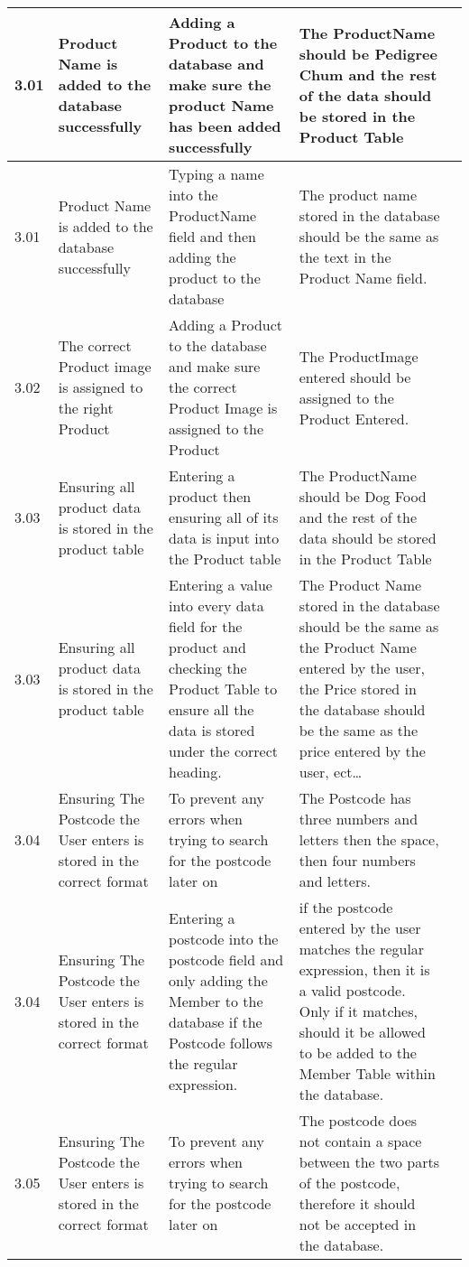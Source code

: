 \begin{flushleft}
\begin{longtable}{|p{1cm}|p{2.5cm}|p{2.5cm}|p{2cm}|p{2cm}|}
	\rowcolor{dark-grey}3.01 & Product Name is added to the database successfully & Adding a Product to the database and make sure the product Name has been added successfully & The ProductName should be Pedigree Chum and the rest of the data should be stored in the Product Table & \\ \hline
	\rowcolor{light-grey}3.01 & Product Name is added to the database successfully & Typing a name into the ProductName field and then adding the product to the database & The product name stored in the database should be the same as the text in the Product Name field.& \\ \hline
	3.02 & The correct Product image is assigned to the right Product & Adding a Product to the database and make sure the correct Product Image is assigned to the Product & The ProductImage entered should be assigned to the Product Entered. & \\ \hline
	\rowcolor{dark-grey}3.03 & Ensuring all product data is stored in the product table & Entering a product then ensuring all of its data is input into the Product table  & The ProductName should be Dog Food and the rest of the data should be stored in the Product Table & \\ \hline
	\rowcolor{light-grey}3.03 & Ensuring all product data is stored in the product table & Entering a value into every data field for the product and checking the Product Table to ensure all the data is stored under the correct heading.  & The Product Name stored in the database should be the same as the Product Name entered by the user, the Price stored in the database should be the same as the price entered by the user, ect\ldots & \\ \hline
	\rowcolor{dark-grey}3.04 & Ensuring The Postcode the User enters is stored in the correct format  & To prevent any errors when trying to search for the postcode later on  & The Postcode has three numbers and letters then the space, then four numbers and letters. & \\ \hline
	\rowcolor{light-grey}3.04 & Ensuring The Postcode the User enters is stored in the correct format  & Entering a postcode into the postcode field and only adding the Member to the database if the Postcode follows the regular expression. &if the postcode entered by the user matches the regular expression, then it is a valid postcode. Only if it matches, should it be allowed to be added to the Member Table within the database.& \\ \hline
	\rowcolor{dark-grey}3.05 & Ensuring The Postcode the User enters is stored in the correct format  & To prevent any errors when trying to search for the postcode later on  & The postcode does not contain a space between the two parts of the postcode, therefore it should not be accepted in the database. & \\ \hline

\end{longtable}
\end{flushleft}
